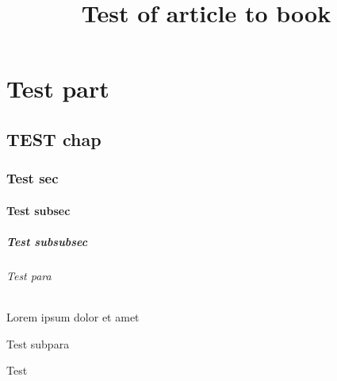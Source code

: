 \documentclass[12pt]{article}
\title{Test of article to book}
\begin{document}
    \tableofcontents
    
    
    \part{Test part}
    
    \chapter{TEST chap}
    \section{Test sec}
    \subsection{Test subsec}
    \subsubsection{Test subsubsec}
    \paragraph{Test para} Lorem ipsum dolor et amet
    \subparagraph{Test subpara}
    Test
\end{document}
